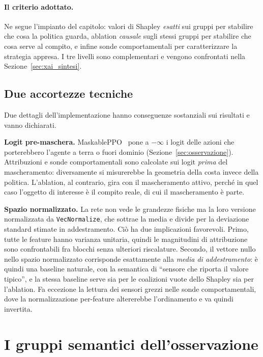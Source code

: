 \paragraph{Il criterio adottato.} Ne segue l'impianto del capitolo: valori di Shapley
\emph{esatti} sui gruppi per stabilire che cosa la politica guarda, ablation
\emph{causale} sugli stessi gruppi per stabilire che cosa serve al compito, e infine
sonde comportamentali per caratterizzare la strategia appresa. I tre livelli sono
complementari e vengono confrontati nella Sezione~\ref{sec:xai_sintesi}.

\subsection{Due accortezze tecniche}
\label{sec:xai_accortezze}

Due dettagli dell'implementazione hanno conseguenze sostanziali sui risultati e vanno
dichiarati.

\textbf{Logit pre-maschera.} MaskablePPO~\cite{maskable_ppo} pone a $-\infty$ i logit
delle azioni che porterebbero l'agente a terra o fuori dominio
(Sezione~\ref{sec:osservazione}). Attribuzioni e sonde comportamentali sono calcolate
sui logit \emph{prima} del mascheramento: diversamente si misurerebbe la geometria
della costa invece della politica. L'ablation, al contrario, gira con il mascheramento
attivo, perch\'e in quel caso l'oggetto di interesse \`e il compito reale, di cui il
mascheramento \`e parte.

\textbf{Spazio normalizzato.} La rete non vede le grandezze fisiche ma la loro versione
normalizzata da \texttt{VecNormalize}, che sottrae la media e divide per la deviazione
standard stimate in addestramento. Ci\`o ha due implicazioni favorevoli. Primo, tutte le
feature hanno varianza unitaria, quindi le magnitudini di attribuzione sono
confrontabili fra blocchi senza ulteriori riscalature. Secondo, il vettore nullo nello
spazio normalizzato corrisponde esattamente alla \emph{media di addestramento}: \`e
quindi una baseline naturale, con la semantica di ``sensore che riporta il valore
tipico'', e la stessa baseline serve sia per le coalizioni vuote dello Shapley sia per
l'ablation. Fa eccezione la lettura dei sensori grezzi nelle sonde comportamentali,
dove la normalizzazione per-feature altererebbe l'ordinamento e va quindi invertita.

\section{I gruppi semantici dell'osservazione}
\label{sec:xai_gruppi}

